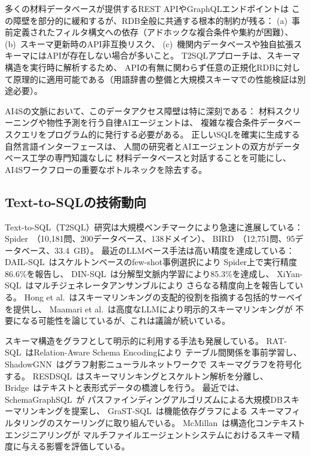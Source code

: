 \documentclass[5p,twocolumn]{elsarticle}
\begin{document}
多くの材料データベースが提供するREST APIやGraphQLエンドポイントは
この障壁を部分的に緩和するが、RDB全般に共通する根本的制約が残る：
(a)~事前定義されたフィルタ構文への依存（アドホックな複合条件や集約が困難）、
(b)~スキーマ更新時のAPI非互換リスク、
(c)~機関内データベースや独自拡張スキーマにはAPIが存在しない場合が多いこと。
T2SQLアプローチは、スキーマ構造を実行時に解析するため、
APIの有無に関わらず任意の正規化RDBに対して原理的に適用可能である（用語辞書の整備と大規模スキーマでの性能検証は別途必要）。

AI4Sの文脈において、このデータアクセス障壁は特に深刻である：
材料スクリーニングや物性予測を行う自律AIエージェントは、
複雑な複合条件データベースクエリをプログラム的に発行する必要がある。
正しいSQLを確実に生成する自然言語インターフェースは、
人間の研究者とAIエージェントの双方がデータベース工学の専門知識なしに
材料データベースと対話することを可能にし、
AI4Sワークフローの重要なボトルネックを除去する。

\subsection{Text-to-SQLの技術動向}

Text-to-SQL（T2SQL）研究は大規模ベンチマークにより急速に進展している：
Spider~\citep{yu2018spider}（10,181問、200データベース、138ドメイン）、
BIRD~\citep{li2024bird}（12,751問、95データベース、33.4~GB）。
最近のLLMベース手法は高い精度を達成している：
DAIL-SQL~\citep{gao2023dail}はスケルトンベースのfew-shot事例選択により
Spider上で実行精度86.6\%を報告し、
DIN-SQL~\citep{pourreza2024dinsql}は分解型文脈内学習により85.3\%を達成し、
XiYan-SQL~\citep{gao2024xiyan}はマルチジェネレータアンサンブルにより
さらなる精度向上を報告している。
Hong et al.~\citep{hong2024survey}はスキーマリンキングの支配的役割を指摘する包括的サーベイを提供し、
Maamari et al.~\citep{maamari2024schema}は高度なLLMにより明示的スキーマリンキングが
不要になる可能性を論じているが、これは議論が続いている。

スキーマ構造をグラフとして明示的に利用する手法も発展している。
RAT-SQL~\citep{wang2020ratsql}はRelation-Aware Schema Encodingにより
テーブル間関係を事前学習し、
ShadowGNN~\citep{chen2021shadowgnn}はグラフ射影ニューラルネットワークで
スキーマグラフを符号化する。
RESDSQL~\citep{li2023resdsql}はスキーマリンキングとスケルトン解析を分離し、
Bridge~\citep{lin2020bridge}はテキストと表形式データの橋渡しを行う。
最近では、SchemaGraphSQL~\citep{safdarian2026schemagraphsql}が
パスファインディングアルゴリズムによる大規模DBスキーマリンキングを提案し、
GraST-SQL~\citep{hoang2025grastsql}は機能依存グラフによる
スキーマフィルタリングのスケーリングに取り組んでいる。
McMillan~\citep{mcmillan2026context}は構造化コンテキストエンジニアリングが
マルチファイルエージェントシステムにおけるスキーマ精度に与える影響を評価している。
\end{document}
